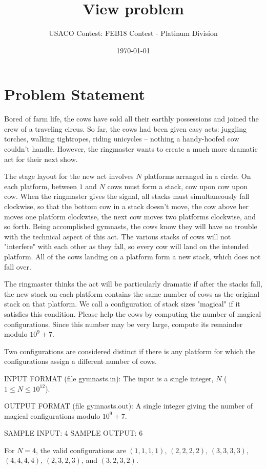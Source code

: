 \documentclass[12pt]{article}
\title{View problem}
\author{USACO Contest: FEB18 Contest - Platinum Division}
\date{\today}
\begin{document}
\maketitle

\section*{Problem Statement}

Bored of farm life, the cows have sold all their earthly possessions and joined
the crew of a traveling circus. So far, the cows had been given easy acts:
juggling torches, walking tightropes, riding unicycles -- nothing a handy-hoofed
cow couldn't handle.  However, the ringmaster wants to create a much more
dramatic  act for their next show.

The stage layout for the new act involves $N$ platforms arranged in a circle. 
On each platform, between $1$ and $N$ cows must form a stack, cow upon cow upon
cow. When the ringmaster gives the signal, all stacks must simultaneously fall
clockwise, so that the bottom cow in a stack doesn't move, the cow above her
moves one platform clockwise, the next cow moves two platforms clockwise, and so
forth.  Being accomplished gymnasts, the cows know they will have no trouble
with the technical aspect of this act. The various stacks of cows will not
"interfere" with each other as they fall, so every cow will land on the intended
platform. All of the cows landing on a platform form a new stack, which does not
fall over.

The ringmaster thinks the act will be particularly dramatic if after the stacks
fall, the new stack on each platform contains the same number of cows as the
original stack on that platform.  We call a configuration of stack sizes
"magical" if it satisfies this condition.  Please help the cows by computing the
number of magical configurations. Since this number may be very large, compute
its remainder modulo $10^9 + 7$.

Two configurations are considered distinct if there is any platform for which
the configurations assign a different number of cows. 

INPUT FORMAT (file gymnasts.in):
The input is a single integer, $N$ ($1 \leq N \leq 10^{12}$).

OUTPUT FORMAT (file gymnasts.out):
A single integer giving the number of magical configurations modulo $10^9 + 7$.

SAMPLE INPUT:
4
SAMPLE OUTPUT: 
6

For $N = 4$, the valid configurations are $(1,1,1,1)$, $(2,2,2,2)$, $(3,3,3,3)$,
$(4,4,4,4)$, $(2,3,2,3)$, and $(3,2,3,2)$.
\end{document}
